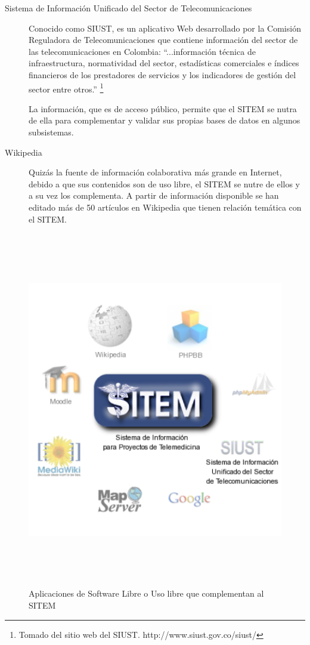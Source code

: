 \begin{description}
\item[Sistema de Información Unificado del Sector de Telecomunicaciones] Conocido como SIUST, es un aplicativo Web desarrollado por la Comisión Reguladora de Telecomunicaciones que contiene información del sector de las telecomunicaciones en Colombia: “...información técnica de infraestructura, normatividad del sector, estadísticas comerciales e índices financieros de los prestadores de servicios y los indicadores de gestión del sector entre otros.” \footnote{Tomado del sitio web del SIUST. http://www.siust.gov.co/siust/}

La información, que es de acceso público, permite que el SITEM se nutra de ella para complementar y validar sus propias bases de datos en algunos subsistemas.

\item[Wikipedia] Quizás la fuente de información colaborativa más grande en Internet, debido a que sus contenidos son de uso libre, el SITEM se nutre de ellos y a su vez los complementa. A partir de información disponible se han editado más de 50 artículos en Wikipedia que tienen relación temática con el SITEM.

 \end{description}

\begin{figure}
 \centering
 \includegraphics[width=156mm, height=156mm]{sitem_aplicaciones.png}
 \caption{Aplicaciones de Software Libre o Uso libre que complementan al SITEM}
 \label{aplicaciones_sitem}
\end{figure}


